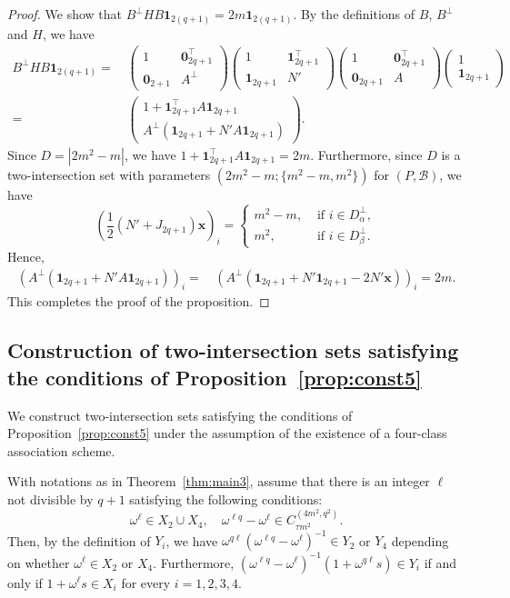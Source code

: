 \documentclass[10pt]{amsart}
\theoremstyle{definition}
\newcommand*\tra{\top}
\newcommand*{\un}{\mathbf{1}}
\newcommand*{\bfx}{\mathbf{x}}
\newcommand*{\bfo}{\mathbf{0}}
\begin{document}
\begin{proof}
We show that $B^\perp H B\un_{2(q+1)}=2m \un_{2(q+1)}$. By the definitions of $B$, $B^\perp$ and $H$, we have
\begin{align*}
B^\perp H B\un_{2(q+1)}=&\,
\begin{pmatrix} 1 & \bfo_{2q+1}^\tra \\
\bfo_{2+1} & A^\perp
\end{pmatrix}
\begin{pmatrix} 1 & \un_{2q+1}^\tra \\
\un_{2q+1} & N'
\end{pmatrix}
\begin{pmatrix} 1 & \bfo_{2q+1}^\tra \\
\bfo_{2q+1} & A
\end{pmatrix}
\begin{pmatrix} 1 \\ \un_{2q+1}
\end{pmatrix}\\
=&\,
\begin{pmatrix}
1+\un_{2q+1}^\tra A \un_{2q+1}\\
A^\perp(\un_{2q+1}+N'A\un_{2q+1})
\end{pmatrix}.
\end{align*}
Since $D=|2m^2-m|$, we have $1+\un_{2q+1}^\tra A \un_{2q+1}=2m$. Furthermore, since $D$ is a two-intersection set with parameters $(2m^2-m;\{m^2-m,m^2\})$ for $(P,{\mathcal B})$, we have
\[
\left(\frac{1}{2}(N'+J_{2q+1})\bfx\right)_i=
\begin{cases}
m^2-m,& \text{ if } i\in D_{\alpha}^\perp,\\
m^2,& \text{ if } i\in D_{\beta}^\perp.
\end{cases}
\]
Hence,
\begin{align*}
\left(A^\perp (\un_{2q+1}+N'A\un_{2q+1})\right)_i=&\,
\left(A^\perp (\un_{2q+1}+N'\un_{2q+1}-2N'\bfx)\right)_i =2m.
\end{align*}
This completes the proof of the proposition.
\end{proof}

\subsection{Construction of two-intersection sets satisfying the conditions of Proposition~\ref{prop:const5}}\label{sec:6.2}
We construct two-intersection sets satisfying the conditions of Proposition~\ref{prop:const5} under the assumption of the existence of a four-class association scheme.

With notations as in Theorem~\ref{thm:main3}, assume that there is an integer $\ell$ not divisible by $q+1$ satisfying the following conditions:
\begin{equation}\label{eq:lext}
\omega^{\ell}\in X_2\cup X_4,\quad \omega^{\ell q}-\omega^\ell\in C_{\tau m^2}^{(4m^2,q^2)}.
\end{equation}
Then, by the definition of $Y_i$, we have $\omega^{q\ell}(\omega^{\ell q}-\omega^\ell)^{-1}\in Y_2$ or $Y_4$ depending on whether $\omega^{\ell}\in X_2$ or $X_4$. Furthermore, $(\omega^{\ell q}-\omega^\ell)^{-1}(1+\omega^{q\ell}s)\in Y_i$ if and only if $1+\omega^\ell s \in X_i$ for every $i=1,2,3,4$.
\end{document}

